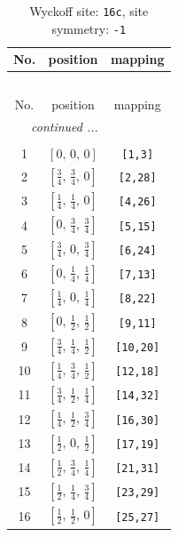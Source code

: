 \documentclass[fleqn,8pt]{jsarticle}
\begin{document}
\begin{longtable}{ccc}
\caption{Wyckoff site: {\tt 16c}, site symmetry: {\tt -1}}
 \\
 \hline \hline
No. & position & mapping \\ \hline \endfirsthead

\multicolumn{2}{l}{\tablename\ \thetable{}} \\
 \hline \hline
No. & position & mapping \\ \hline \endhead

 \hline \hline
\multicolumn{2}{r}{\footnotesize\it continued ...} \\ \endfoot

 \hline \hline
\multicolumn{2}{r}{} \\ \endlastfoot

1 & $\left[ 0,\, 0,\, 0 \right]$ & {\tt [1,3]} \\ \hline
2 & $\left[ \frac{3}{4},\, \frac{3}{4},\, 0 \right]$ & {\tt [2,28]} \\ \hline
3 & $\left[ \frac{1}{4},\, \frac{1}{4},\, 0 \right]$ & {\tt [4,26]} \\ \hline
4 & $\left[ 0,\, \frac{3}{4},\, \frac{3}{4} \right]$ & {\tt [5,15]} \\ \hline
5 & $\left[ \frac{3}{4},\, 0,\, \frac{3}{4} \right]$ & {\tt [6,24]} \\ \hline
6 & $\left[ 0,\, \frac{1}{4},\, \frac{1}{4} \right]$ & {\tt [7,13]} \\ \hline
7 & $\left[ \frac{1}{4},\, 0,\, \frac{1}{4} \right]$ & {\tt [8,22]} \\ \hline
8 & $\left[ 0,\, \frac{1}{2},\, \frac{1}{2} \right]$ & {\tt [9,11]} \\ \hline
9 & $\left[ \frac{3}{4},\, \frac{1}{4},\, \frac{1}{2} \right]$ & {\tt [10,20]} \\ \hline
10 & $\left[ \frac{1}{4},\, \frac{3}{4},\, \frac{1}{2} \right]$ & {\tt [12,18]} \\ \hline
11 & $\left[ \frac{3}{4},\, \frac{1}{2},\, \frac{1}{4} \right]$ & {\tt [14,32]} \\ \hline
12 & $\left[ \frac{1}{4},\, \frac{1}{2},\, \frac{3}{4} \right]$ & {\tt [16,30]} \\ \hline
13 & $\left[ \frac{1}{2},\, 0,\, \frac{1}{2} \right]$ & {\tt [17,19]} \\ \hline
14 & $\left[ \frac{1}{2},\, \frac{3}{4},\, \frac{1}{4} \right]$ & {\tt [21,31]} \\ \hline
15 & $\left[ \frac{1}{2},\, \frac{1}{4},\, \frac{3}{4} \right]$ & {\tt [23,29]} \\ \hline
16 & $\left[ \frac{1}{2},\, \frac{1}{2},\, 0 \right]$ & {\tt [25,27]} \\
\end{longtable}
\end{document}
